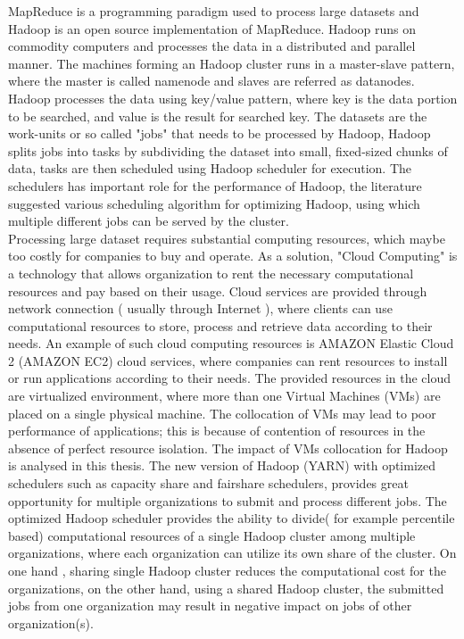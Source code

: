 MapReduce is a programming paradigm used to process large datasets and Hadoop is an open source implementation of MapReduce. Hadoop runs on commodity computers and processes the data in a distributed and parallel manner. The machines forming an Hadoop cluster runs in a master-slave pattern, where the master is called namenode and slaves are referred as datanodes. Hadoop processes the data using key/value pattern, where key is the data portion to be searched, and value is the result for searched key. The datasets are the work-units or so called "jobs" that needs to be processed by Hadoop, Hadoop splits jobs into tasks by subdividing the dataset into small, fixed-sized chunks of data, tasks are then scheduled using Hadoop scheduler for execution. The schedulers has important role for the performance of Hadoop, the literature suggested various scheduling algorithm for optimizing Hadoop, using which multiple different jobs can be served by the cluster. \\
 

 Processing large dataset requires substantial computing resources, which maybe too costly for companies to buy and operate. As a solution,  "Cloud Computing" is a technology that allows organization to rent the necessary computational resources and pay based on their usage. Cloud services are provided through network connection ( usually through Internet ), where clients can use computational resources to store, process and retrieve data according to their needs. An example of such cloud computing resources is AMAZON Elastic Cloud 2 (AMAZON EC2) cloud services, where companies can rent resources to install or run applications according to their needs. The provided resources in the cloud are virtualized environment, where more than one Virtual Machines (VMs) are placed on a single physical machine. The collocation of VMs may lead to poor performance of applications; this is because of contention of resources in the absence of perfect resource isolation.  The impact of VMs collocation for Hadoop is analysed in this thesis. The new version of Hadoop (YARN) with optimized schedulers such as capacity share and fairshare schedulers, provides great opportunity for multiple organizations to submit and process different jobs. The optimized Hadoop scheduler provides the ability to divide( for example percentile based) computational resources of a single Hadoop cluster among multiple organizations, where each organization can utilize its own share of the cluster. On one hand , sharing single Hadoop cluster reduces the computational cost for the organizations, on the other hand, using a shared Hadoop cluster, the submitted jobs from one organization may result in negative impact on jobs of other organization(s).
 
